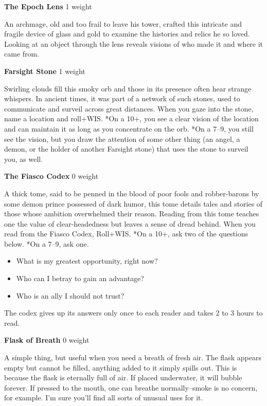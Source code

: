 {\noindent \bfseries The Epoch Lens} \hspace*{\fill} 1 weight

An archmage, old and too frail to leave his tower, crafted this intricate and fragile device of glass and gold to examine the histories and relics he so loved. Looking at an object through the lens reveals visions of who made it and where it came from.

{\noindent \bfseries Farsight Stone} \hspace*{\fill} 1 weight

Swirling clouds fill this smoky orb and those in its presence often hear strange whispers. In ancient times, it was part of a network of such stones, used to communicate and surveil across great distances. When you gaze into the stone, name a location and roll+WIS. *On a 10+, you see a clear vision of the location and can maintain it as long as you concentrate on the orb. *On a 7--9, you still see the vision, but you draw the attention of some other thing (an angel, a demon, or the holder of another Farsight stone) that uses the stone to surveil you, as well.

{\noindent \bfseries The Fiasco Codex} \hspace*{\fill} 0 weight

A thick tome, said to be penned in the blood of poor fools and robber-barons by some demon prince possessed of dark humor, this tome details tales and stories of those whose ambition overwhelmed their reason. Reading from this tome teaches one the value of clear-headedness but leaves a sense of dread behind. When you read from the Fiasco Codex, Roll+WIS. *On a 10+, ask two of the questions below. *On a 7--9, ask one.
\begin{itemize}
\item What is my greatest opportunity, right now?
\item Who can I betray to gain an advantage?
\item Who is an ally I should not trust?

\end{itemize}

The codex gives up its answers only once to each reader and takes 2 to 3 hours to read.

{\noindent \bfseries Flask of Breath} \hspace*{\fill} 0 weight

A simple thing, but useful when you need a breath of fresh air. The flask appears empty but cannot be filled, anything added to it simply spills out. This is because the flask is eternally full of air. If placed underwater, it will bubble forever. If pressed to the mouth, one can breathe normally--smoke is no concern, for example. I'm sure you'll find all sorts of unusual uses for it.

